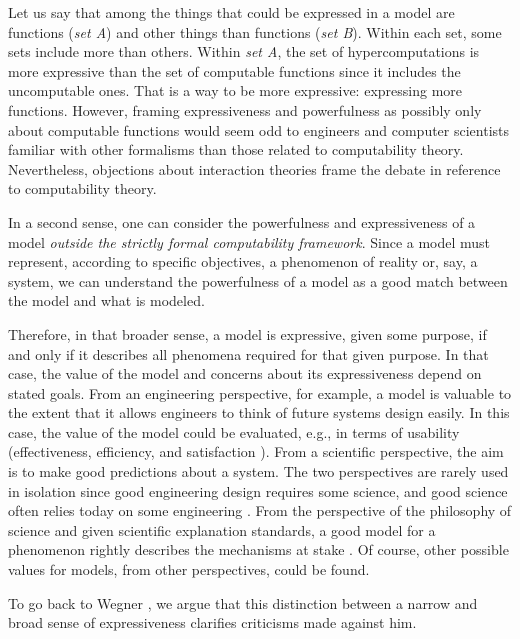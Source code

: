 \documentclass[a4paper, 11pt, twoside]{article}
\begin{document}
Let us say that among the things that could be expressed in a model are functions (\textit{set A}) and other things than functions (\textit{set B}). Within each set, some sets include more than others.
Within \textit{set A}, the set of hypercomputations is more expressive than the set of computable functions since it includes the uncomputable ones.
That is a way to be more expressive: expressing more functions. However, framing expressiveness and powerfulness as possibly only about computable functions would seem odd to engineers and computer scientists familiar with other formalisms than those related to computability theory. Nevertheless, objections about interaction theories frame the debate in reference to computability theory.


In a second sense, one can consider the powerfulness and expressiveness of a model \textit{outside the strictly formal computability framework}. Since a model must represent, according to specific objectives, a phenomenon of reality or, say, a system, we can understand the powerfulness of a model as a good match between the model and what is modeled. 

Therefore, in that broader sense, a model is expressive, given some purpose, if and only if it describes all phenomena required for that given purpose. In that case, the value of the model and concerns about its expressiveness depend on stated goals. 
From an engineering perspective, for example, a model is valuable to the extent that it allows engineers to think of future systems design easily. In this case, the value of the model could be evaluated, e.g., in terms of usability (effectiveness, efficiency, and satisfaction \parencite{ISO2018}). From a scientific perspective, the aim is to make good predictions about a system. The two perspectives are rarely used in isolation since good engineering design requires some science, and good science often relies today on some engineering \parencite{Lee2016}.
From the perspective of the philosophy of science and given scientific explanation standards, a good model for a phenomenon rightly describes the mechanisms at stake \parencite{Glennan2002, Machamer2000, Mikowski2016}. Of course, other possible values for models, from other perspectives, could be found.



To go back to Wegner \parencite{Wegner1995, Wegner1997, Wegner1998, Goldin2000}, we argue that this distinction between a narrow and broad sense of expressiveness clarifies criticisms made against him. 
\end{document}
